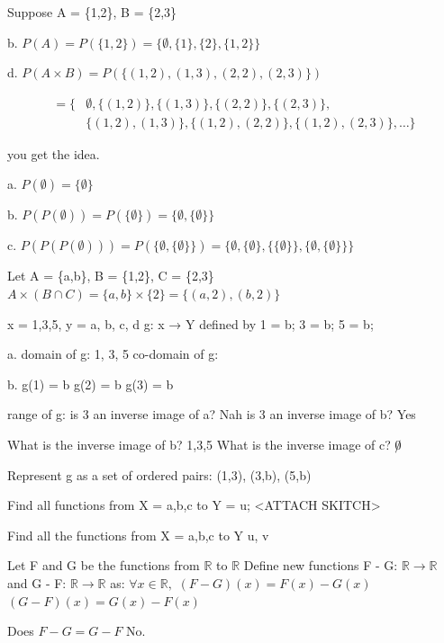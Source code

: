\documentclass[12pt]{article}
\begin{document}
Suppose A = \{1,2\}, B = \{2,3\}

b. $P(A) = P(\{1,2\}) = \{\emptyset, \{1\}, \{2\}, \{1,2\}\}$

d. $P(A \times B) = P(\{(1,2), (1,3), (2,2), (2,3)\})$

\begin{align}
= \{ &\emptyset, \{(1,2)\}, \{(1,3)\}, \{(2,2)\}, \{(2,3)\}, \\
&\{(1,2), (1,3)\}, \{(1,2), (2,2)\}, \{(1,2), (2,3)\}, \ldots \}
\end{align}

you get the idea.

a. $P(\emptyset) = \{\emptyset\}$

b. $P(P(\emptyset)) = P(\{\emptyset\}) = \{\emptyset, \{\emptyset\}\}$

c. $P(P(P(\emptyset))) = P(\{\emptyset, \{\emptyset\}\}) = \{\emptyset, \{\emptyset\}, \{\{\emptyset\}\}, \{\emptyset, \{\emptyset\}\}\}$

Let A = \{a,b\}, B = \{1,2\}, C = \{2,3\}
$A \times (B \cap C) = \{a,b\} \times \{2\} = \{(a,2), (b,2)\}$

x = {1,3,5}, y = {a, b, c, d}
g: x → Y defined by 1 = b; 3 = b; 5 = b;

a. domain of g: {1, 3, 5}
   co-domain of g:

b. g(1) = b
   g(2) = b
   g(3) = b

range of g:
is 3 an inverse image of a? Nah
is 3 an inverse image of b? Yes

What is the inverse image of b? {1,3,5}
What is the inverse image of c? $\not 0$

Represent g as a set of ordered pairs: {(1,3), (3,b), (5,b)}


Find all functions from X = {a,b,c} to Y = {u};
<ATTACH SKITCH>

Find all the functions from X = {a,b,c} to Y {u, v}

Let F and G be the functions from $\mathbb{R}$ to $\mathbb{R}$
Define new functions F - G: $\mathbb{R} \rightarrow \mathbb{R}$ and G - F: $\mathbb{R} \rightarrow \mathbb{R}$ as:
$\forall x \in \mathbb{R}, $
$(F - G)(x) = F(x) - G(x)$
$(G - F)(x) = G(x) - F(x)$


Does $F - G = G - F$
No.
\end{document}
